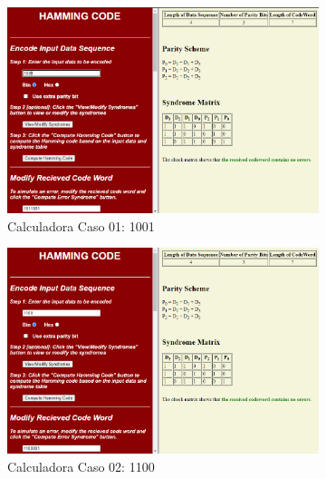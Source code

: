 \documentclass{article}
\begin{document}
\afterpage{\clearpage}

\begin{figure}[htbp]
    \centering
    \begin{subfigure}[b]{0.22\textwidth}
        \includegraphics[width=\textwidth]{4bitsCaso01_Calculadora.png}
        \caption{Calculadora Caso 01: 1001}
        \label{fig:imagem1}
    \end{subfigure}
    \hfill
    \begin{subfigure}[b]{0.22\textwidth}
        \includegraphics[width=\textwidth]{4bitsCaso02_Calculadora.png}
        \caption{Calculadora Caso 02: 1100}
        \label{fig:imagem2}
    \end{subfigure}
    \hfill
    \begin{subfigure}[b]{0.22\textwidth}

\end{subfigure}
\end{figure}
\end{document}
